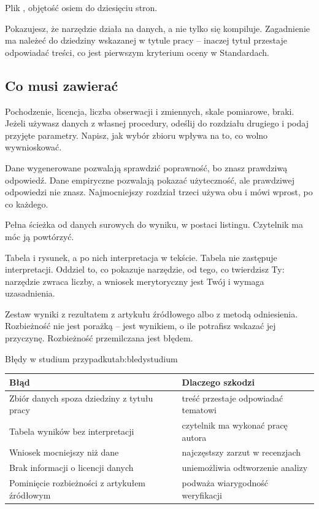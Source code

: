 Plik , objętość osiem do dziesięciu stron.

Pokazujesz, że narzędzie działa na danych, a nie tylko się kompiluje. Zagadnienie ma należeć do dziedziny wskazanej w tytule pracy -- inaczej tytuł przestaje odpowiadać treści, co jest pierwszym kryterium oceny w Standardach.

\subsection{Co musi zawierać}

 Pochodzenie, licencja, liczba obserwacji i zmiennych, skale pomiarowe, braki. Jeżeli używasz danych z własnej procedury, odeślij do rozdziału drugiego i podaj przyjęte parametry. Napisz, jak wybór zbioru wpływa na to, co wolno wywnioskować.

Dane wygenerowane pozwalają sprawdzić poprawność, bo znasz prawdziwą odpowiedź. Dane empiryczne pozwalają pokazać użyteczność, ale prawdziwej odpowiedzi nie znasz. Najmocniejszy rozdział trzeci używa obu i mówi wprost, po co każdego.

 Pełna ścieżka od danych surowych do wyniku, w postaci listingu. Czytelnik ma móc ją powtórzyć.

 Tabela i rysunek, a po nich interpretacja w tekście. Tabela nie zastępuje interpretacji. Oddziel to, co pokazuje narzędzie, od tego, co twierdzisz Ty: narzędzie zwraca liczby, a wniosek merytoryczny jest Twój i wymaga uzasadnienia.

 Zestaw wyniki z rezultatem z artykułu źródłowego albo z metodą odniesienia. Rozbieżność nie jest porażką -- jest wynikiem, o ile potrafisz wskazać jej przyczynę. Rozbieżność przemilczana jest błędem.

\begin{tabelaepi}{Błędy w studium przypadku}{tab:bledystudium}
\begin{tabular}{@{}p{6.6cm}p{6.6cm}@{}}
\toprule
Błąd & Dlaczego szkodzi \\
\midrule
Zbiór danych spoza dziedziny z tytułu pracy & treść przestaje odpowiadać tematowi \\
Tabela wyników bez interpretacji & czytelnik ma wykonać pracę autora \\
Wniosek mocniejszy niż dane & najczęstszy zarzut w recenzjach \\
Brak informacji o licencji danych & uniemożliwia odtworzenie analizy \\
Pominięcie rozbieżności z artykułem źródłowym & podważa wiarygodność weryfikacji \\
\bottomrule
\end{tabular}
\end{tabelaepi}

